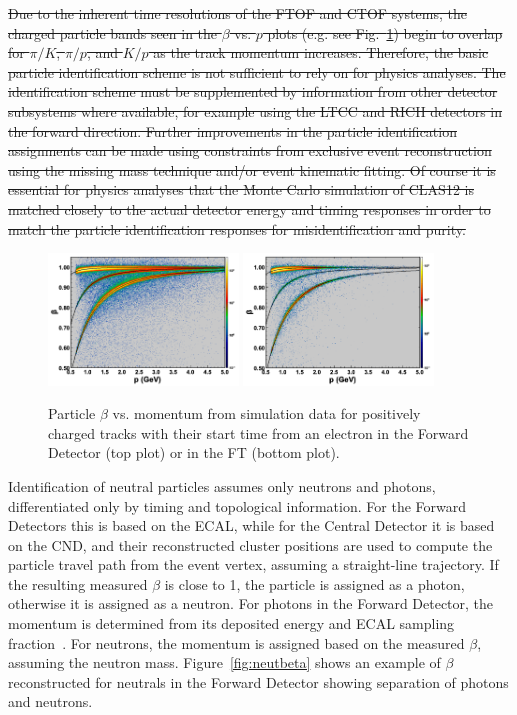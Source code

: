 {\color{red}\sout{ Due to the inherent time resolutions of the FTOF and CTOF systems, the charged particle bands seen in the
$\beta$ vs. $p$ plots (e.g. see Fig.~\ref{fig:betavsp}) begin to overlap for $\pi/K$, $\pi/p$, and $K/p$ as
the track momentum increases. Therefore, the basic particle identification scheme is not sufficient to rely on
for physics analyses. The identification scheme must be supplemented by information from other detector
subsystems where available, for example using the LTCC and RICH detectors in the forward direction. Further
improvements in the particle identification assignments can be made using constraints from exclusive event
reconstruction using the missing mass technique and/or event kinematic fitting. Of course it is essential for
physics analyses that the Monte Carlo simulation of CLAS12 is matched closely to the actual detector energy and
timing responses in order to match the particle identification responses for misidentification and purity.}}

\begin{figure}[t]
\centering
\includegraphics[width=0.45\textwidth]{pics/ftof_betap.png}
\includegraphics[width=0.45\textwidth]{pics/ft_betap.png}
\caption{Particle $\beta$ vs. momentum from simulation data for positively charged tracks with their start time
  from an electron in the Forward Detector (top plot) or in the FT (bottom plot).}
\label{fig:betavsp}
\end{figure}

{\color{red} Identification of neutral particles assumes only neutrons and photons, differentiated only by timing and
topological information. For the Forward Detectors this is based on the ECAL, while for the Central
Detector it is based on the CND, and their reconstructed cluster positions are used to compute the particle
travel path from the event vertex, assuming a straight-line trajectory.
If the resulting measured $\beta$ is close to 1, the particle is assigned as a photon, otherwise it
is assigned as a neutron. For photons in the Forward Detector, the momentum is determined
from its deposited energy and ECAL sampling fraction~\cite{ecal-nim}. For
neutrons, the momentum is assigned based on the measured $\beta$, assuming the neutron mass.}
Figure~\ref{fig:neutbeta} shows an example of $\beta$ reconstructed for neutrals in the Forward Detector
showing separation of photons and neutrons.

